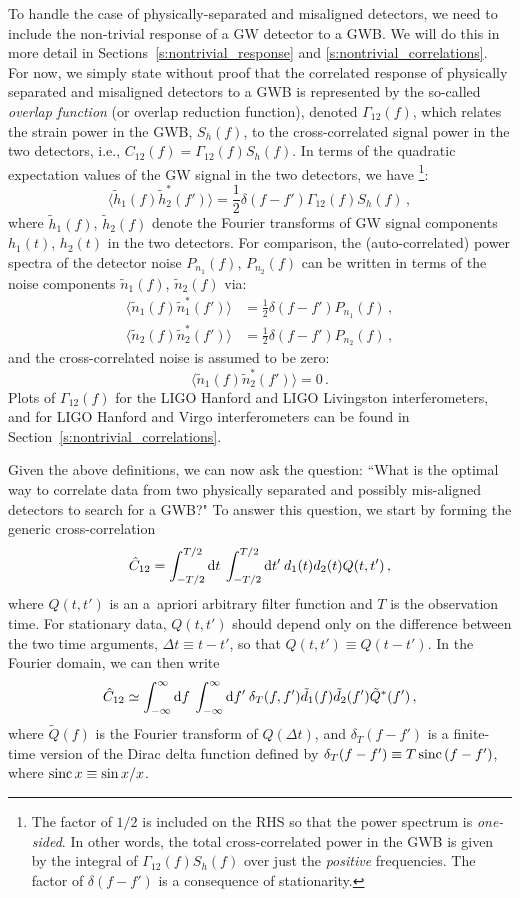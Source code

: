 \documentclass[11pt]{article}
\numberwithin{equation}{section}
\def\be{\begin{equation}}
\def\ee{\end{equation}}
\def\D{{\rm d}}
\begin{document}
To handle the case of physically-separated and misaligned 
detectors, we need to include the non-trivial response of 
a GW detector to a GWB.  
We will do this in more detail in 
Sections~\ref{s:nontrivial_response} and
\ref{s:nontrivial_correlations}.
For now, we simply state without proof that the 
correlated response of physically separated and misaligned 
detectors to a GWB is represented by the so-called 
{\em overlap function} (or overlap reduction function),
denoted $\Gamma_{12}(f)$, 
which relates the strain power in the
GWB, $S_h(f)$, to the cross-correlated signal power 
in the two detectors, i.e., $C_{12}(f) = \Gamma_{12}(f) S_h(f)$.
In terms of the quadratic expectation values of the GW 
signal in the two detectors, we have%
\footnote{The factor of $1/2$ is included on the RHS
so that the power spectrum is {\em one-sided}.
In other words, 
the total cross-correlated power in the GWB is
given by the integral of $\Gamma_{12}(f)S_h(f)$ over just
the {\em positive} frequencies.
The factor of $\delta(f-f')$ is a consequence of stationarity.}:
%
\be
\langle \tilde h_1(f) \tilde h_2^*(f')\rangle
=\frac{1}{2}\delta(f-f')\Gamma_{12}(f)S_h(f)\,,
\ee
%
where $\tilde h_1(f)$, $\tilde h_2(f)$ denote the 
Fourier transforms of GW signal components 
$h_1(t)$, $h_2(t)$ in  the two detectors.
For comparison, the (auto-correlated) power spectra 
of the detector noise $P_{n_1}(f)$, $P_{n_2}(f)$ 
can be written in terms of the noise components 
$\tilde n_1(f)$, $\tilde n_2(f)$ via:
%
\be
\begin{aligned}
\langle \tilde n_1(f) \tilde n_1^*(f')\rangle
&=\frac{1}{2}\delta(f-f')P_{n_1}(f)\,,
\\
\langle \tilde n_2(f) \tilde n_2^*(f')\rangle
&=\frac{1}{2}\delta(f-f')P_{n_2}(f)\,,
\end{aligned}
\ee
%
and the cross-correlated noise is assumed to be zero:
%
\be
\langle \tilde n_1(f) \tilde n_2^*(f')\rangle =0\,.
\ee
Plots of $\Gamma_{12}(f)$ for the LIGO Hanford and 
LIGO Livingston interferometers, and for LIGO Hanford
and Virgo interferometers can be found in 
Section~\ref{s:nontrivial_correlations}.

Given the above definitions, we can now ask
the question: ``What is the optimal way to correlate 
data from two physically separated and possibly 
mis-aligned detectors to search for a GWB?"
To answer this question, we start by forming the 
generic cross-correlation
%
\be
\hat C_{12} = \int_{-T/2}^{T/2}\D t\>\int_{-T/2}^{T/2}\D t'\>
d_1(t)d_2(t) Q(t,t')\,,
\ee
%
where $Q(t,t')$ is an a~apriori arbitrary filter 
function and $T$ is the observation time.
For stationary data, $Q(t,t')$ should depend only on
the difference between the two time arguments, 
$\Delta t\equiv t-t'$, 
so that $Q(t,t')\equiv Q(t-t')$.
In the Fourier domain, we can then write
%
\be
\hat C_{12} \simeq 
\int_{-\infty}^{\infty}\D f\>\int_{-\infty}^{\infty}\D f'\>
\delta_T(f,f')\tilde d_1(f)\tilde d_2(f') \tilde Q^*(f')\,,
\ee
%
where $\tilde Q(f)$ is the Fourier transform of 
$Q(\Delta t)$, and $\delta_T(f-f')$ is a finite-time
version of the Dirac delta function defined by 
$\delta_T(f-f')\equiv T\,{\rm sinc}\,(f-f')$, where
${\rm sinc}\,x \equiv \sin x/x$.
\end{document}
